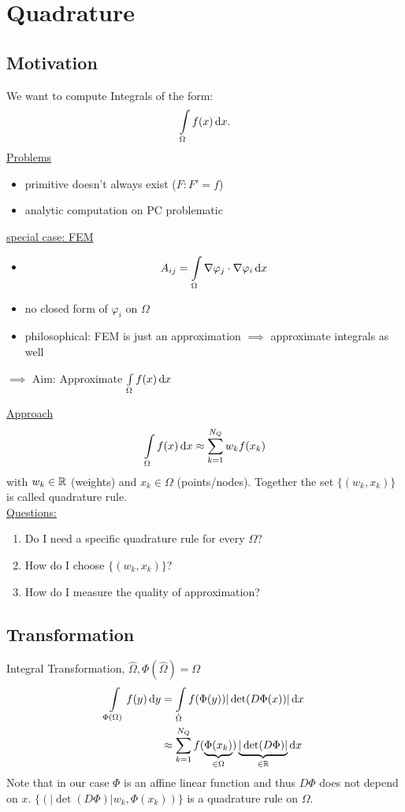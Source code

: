 \section{Quadrature}

\subsection{Motivation}
We want to compute Integrals of the form:
\begin{align*}
	\int \limits_\Omega f(x) \mathop{}\!\mathrm{d} x.
\end{align*}
\underline{Problems}
\begin{itemize}
	\item primitive doesn't always exist ($F\colon F'=f$)
	\item analytic computation on PC problematic
\end{itemize}

 \underline{special case: FEM}
 \begin{itemize}
 	\item 
 	\begin{equation*}
 		A_{ij} = \int \limits_\Omega \nabla \varphi_j \cdot \nabla \varphi_i \mathop{}\!\mathrm{d} x
 	\end{equation*}
 	\item no closed form of $\varphi_i$ on $\Omega$
 	\item philosophical: FEM is just an approximation $\implies$ approximate integrals as well
 \end{itemize}

$\implies$ Aim: Approximate $\int \limits_\Omega f(x) \mathop{}\!\mathrm{d} x$

\underline{Approach}
\begin{equation*}
	\int \limits_\Omega f(x) \mathop{}\!\mathrm{d} x \approx \displaystyle \sum_{k=1}^{N_Q} w_k f(x_k)
\end{equation*}
with $w_k \in \mathbb{R}$ (weights) and $x_k \in \Omega$ (points/nodes). Together the set $\{(w_k,x_k)\}$ is called quadrature rule.\\
\underline{Questions:}
\begin{enumerate}[label=\arabic*)]
	\item Do I need a specific quadrature rule for every $\Omega$?
	\item How do I choose $\{(w_k,x_k)\}$?
	\item How do I measure the quality of approximation?
\end{enumerate}

\subsection{Transformation}
Integral Transformation, $\hat{\Omega}, \Phi(\hat{\Omega}) = \Omega$
\begin{align}
	\int \limits_{\Phi(\Omega)}  f(y) \mathop{}\!\mathrm{d} y &= \int \limits_{\hat{\Omega}} f(\Phi(y)) |\det(D\Phi(x))| \mathop{}\!\mathrm{d} x \\
	&\approx \displaystyle \sum^{N_Q}_{k=1} f(\underbrace{\Phi(x_k)}_{\in \Omega}) \underbrace{|\det(D\Phi)|}_{\in \mathbb{R}} \mathop{}\!\mathrm{d} x 
\end{align}
Note that in our case $\Phi$ is an affine linear function and thus $D\Phi$ does not depend on $x$.
$\{(|\det(D\Phi)|w_k,\Phi(x_k))\}$ is a quadrature rule on $\Omega$.
